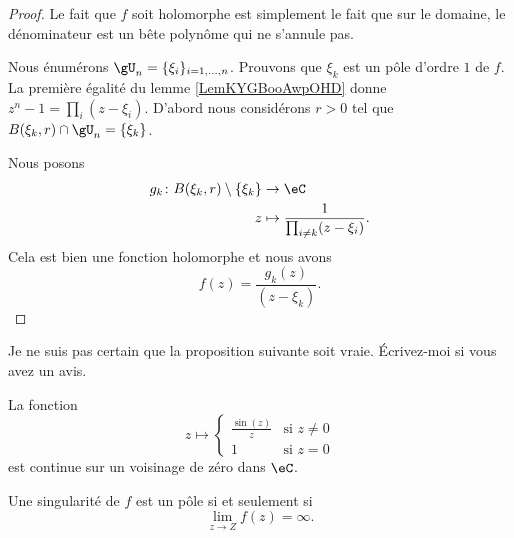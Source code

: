 \begin{proof}
	Le fait que \( f\) soit holomorphe est simplement le fait que sur le domaine, le dénominateur est un bête polynôme qui ne s'annule pas.

	Nous énumérons \( \gU_n = \{ \xi_i \}_{i=1,\ldots, n}\). Prouvons que \( \xi_k\) est un pôle d'ordre \( 1\) de \( f\). La première égalité du lemme \ref{LemKYGBooAwpOHD} donne \( z^n-1=\prod_i(z-\xi_i)\). D'abord nous considérons \( r>0\) tel que \( B(\xi_k,r)\cap \gU_n=\{ \xi_k \}\).

	Nous posons
	\begin{equation}
		\begin{aligned}
			g_k\colon B(\xi_k,r)\setminus\{ \xi_k \} & \to \eC                                       \\
			z                                        & \mapsto \frac{1}{ \prod_{i\neq k}(z-\xi_i) }.
		\end{aligned}
	\end{equation}
	Cela est bien une fonction holomorphe et nous avons
	\begin{equation}
		f(z)=\frac{ g_k(z) }{ (z-\xi_k) }.
	\end{equation}
\end{proof}

\begin{probleme}
	Je ne suis pas certain que la proposition suivante soit vraie. Écrivez-moi si vous avez un avis.
\end{probleme}

\begin{proposition}		\label{PROPooKXXSooGzbmeo}
	La fonction
	\begin{equation}
		z\mapsto \begin{cases}
			\frac{ \sin(z) }{ z } & \text{si } z\neq 0 \\
			1                     & \text{si } z=0
		\end{cases}
	\end{equation}
	est continue sur un voisinage de zéro dans \( \eC\).
\end{proposition}

\begin{proposition}		\label{PROPooQJDCooYwmkRS}
	Une singularité de \( f\) est un pôle si et seulement si
	\begin{equation}
		\lim_{z\to Z}f(z)=\infty.
	\end{equation}
\end{proposition}

